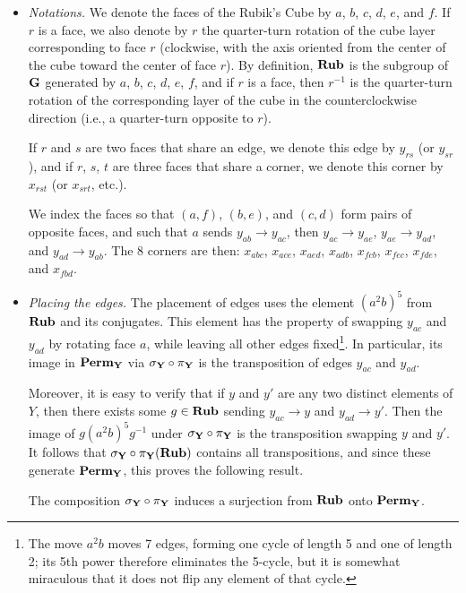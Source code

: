\begin{itemize}
    \item \emph{Notations.} We denote the faces of the Rubik's Cube by $a$, $b$, $c$, $d$, $e$, and $f$.
    If $r$ is a face, we also denote by $r$ the quarter-turn rotation of the cube layer corresponding to face $r$ (clockwise, with the axis oriented from the center of the cube toward the center of face $r$).
    By definition, $\mathbf{Rub}$ is the subgroup of $\mathbf{G}$ generated by $a$, $b$, $c$, $d$, $e$, $f$, and if $r$ is a face, then $r^{-1}$ is the quarter-turn rotation of the corresponding layer of the cube in the counterclockwise direction (i.e., a quarter-turn opposite to $r$).

    If $r$ and $s$ are two faces that share an edge, we denote this edge by $y_{rs}$ (or $y_{sr}$), and if $r$, $s$, $t$ are three faces that share a corner, we denote this corner by $x_{rst}$ (or $x_{srt}$, etc.).

    We index the faces so that $(a, f)$, $(b, e)$, and $(c, d)$ form pairs of opposite faces, and such that $a$ sends $y_{ab} \to y_{ac}$, then $y_{ac} \to y_{ae}$, $y_{ae} \to y_{ad}$, and $y_{ad} \to y_{ab}$.
    The 8 corners are then:
    $x_{abc}$, $x_{ace}$, $x_{aed}$, $x_{adb}$, $x_{fcb}$, $x_{fec}$, $x_{fde}$, and $x_{fbd}$.

    \item \emph{Placing the edges.}
    The placement of edges uses the element $(a^2b)^5$ from $\mathbf{Rub}$ and its conjugates.
    This element has the property of swapping $y_{ac}$ and $y_{ad}$ by rotating face $a$, while leaving all other edges fixed\footnote{The move $a^2 b$ moves 7 edges, forming one cycle of length 5 and one of length 2; its 5th power therefore eliminates the 5-cycle, but it is somewhat miraculous that it does not flip any element of that cycle.}.
    In particular, its image in $\mathbf{Perm}_{\mathbf{Y}}$ via $\sigma_{\mathbf{Y}} \circ \pi_{\mathbf{Y}}$ is the transposition of edges $y_{ac}$ and $y_{ad}$.

    Moreover, it is easy to verify that if $y$ and $y'$ are any two distinct elements of $Y$, then there exists some $g \in \mathbf{Rub}$ sending $y_{ac} \to y$ and $y_{ad} \to y'$.
    Then the image of $g(a^2b)^5g^{-1}$ under $\sigma_{\mathbf{Y}} \circ \pi_{\mathbf{Y}}$ is the transposition swapping $y$ and $y'$.
    It follows that $\sigma_{\mathbf{Y}} \circ \pi_{\mathbf{Y}}(\mathbf{Rub})$ contains all transpositions, and since these generate $\mathbf{Perm}_{\mathbf{Y}}$, this proves the following result.

    \begin{lemma}
        \label{lem:comp}
        The composition $\sigma_{\mathbf{Y}} \circ \pi_{\mathbf{Y}}$ induces a surjection from $\mathbf{Rub}$ onto $\mathbf{Perm}_{\mathbf{Y}}$.
    \end{lemma}


\end{itemize}
